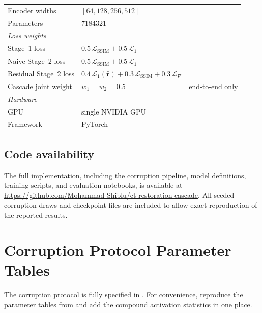 \begin{table}[!htb]
\begin{tabular}{@{}lll@{}}
        Encoder widths  & $[64,128,256,512]$ & \\
        Parameters      & \num{7184321} & \\
        \midrule
        \multicolumn{3}{l}{\textit{Loss weights}} \\
        Stage~1 loss    & $0.5\,\mathcal{L}_\mathrm{SSIM} + 0.5\,\mathcal{L}_1$ & \\
        Naive Stage~2 loss & $0.5\,\mathcal{L}_\mathrm{SSIM} + 0.5\,\mathcal{L}_1$ & \\
        Residual Stage~2 loss & $0.4\,\mathcal{L}_1(\hat{\mathbf{r}}) + 0.3\,\mathcal{L}_\mathrm{SSIM} + 0.3\,\mathcal{L}_\nabla$ & \\
        Cascade joint weight & $w_1=w_2=0.5$ & end-to-end only \\
        \midrule
        \multicolumn{3}{l}{\textit{Hardware}} \\
        GPU             & single NVIDIA GPU & \\
        Framework       & PyTorch & \\
        \bottomrule
    \end{tabular}
\end{table}

\section*{Code availability}

The full implementation, including the corruption pipeline, model definitions, training scripts, and evaluation notebooks, is available at \url{https://github.com/Mohammad-Shiblu/ct-restoration-cascade}. All seeded corruption draws and checkpoint files are included to allow exact reproduction of the reported results.


\chapter{Corruption Protocol Parameter Tables}
\label{app:protocol_params}

The corruption protocol is fully specified in . For convenience,  reproduce the parameter tables from  and add the compound activation statistics in one place.

